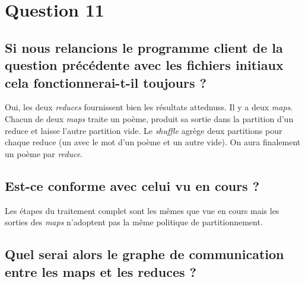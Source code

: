 \documentclass{article}
\begin{document}
  \section*{Question 11} 

    \subsection*{Si nous relancions le programme client de la question
      précédente avec les fichiers initiaux cela fonctionnerai-t-il toujours ?}

      Oui, les deux {\it reduces} fournissent bien les résultats attednuss. Il y
      a deux {\it maps}. Chacun de deux {\it maps} traite un poème, produit sa
      sortie dans la partition d'un reduce et laisse l'autre partition vide. Le
      {\it shuffle} agrège deux partitions pour chaque reduce (un avec le mot d'un
      poème et un autre vide). On aura finalement un poème par {\it reduce}.

    \subsection*{Est-ce conforme avec celui vu en cours ?}

      Les étapes du traitement complet sont les mêmes que vue en cours mais les
      sorties des {\it maps} n'adoptent pas la même politique de
      partitionnement.

    \subsection*{Quel serai alors le graphe de communication entre les maps et les reduces ?}
\end{document}
